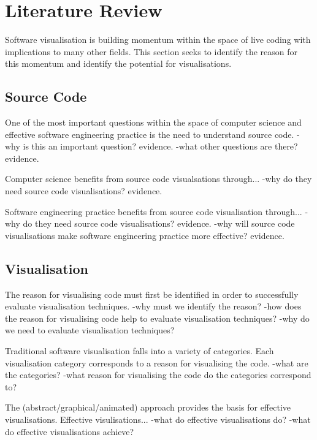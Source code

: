 
\chapter{Literature Review}
\label{cha:literaturereview}

Software visualisation is building momentum within the space of live coding with implications to many other fields. This section seeks to identify the reason for this momentum and identify the potential for visualisations.

\section{Source Code}

One of the most important questions within the space of computer science and effective software engineering practice is the need to understand source code.
-why is this an important question? evidence.
-what other questions are there? evidence.

Computer science benefits from source code visualsations through...
-why do they need source code visualisations? evidence.

Software engineering practice benefits from source code visualisation through...
-why do they need source code visualisations? evidence.
-why will source code visualisations make software engineering practice more effective? evidence.


\section{Visualisation}

The reason for visualising code must first be identified in order to successfully evaluate visualisation techniques.
-why must we identify the reason?
-how does the reason for visualising code help to evaluate visualisation techniques?
-why do we need to evaluate visualisation techniques?

Traditional software visualisation falls into a variety of categories. Each visualisation category corresponds to a reason for visualising the code.
-what are the categories?
-what reason for visualising the code do the categories correspond to?

The (abstract/graphical/animated) approach provides the basis for effective visualisations. Effective visulisations...
-what do effective visualisations do?
-what do effective visualisations achieve?


